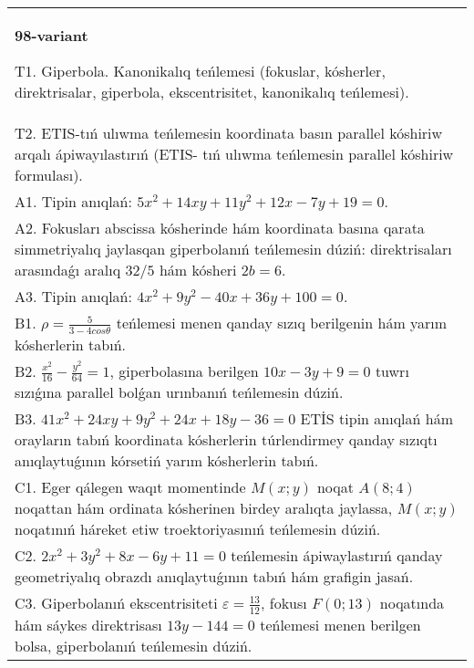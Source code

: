 \documentclass{article}
\begin{document}
\begin{tabular}{m{17cm}}
\textbf{98-variant}
\newline

T1. Giperbola. Kanonikalıq teńlemesi (fokuslar, kósherler, direktrisalar, giperbola, ekscentrisitet, kanonikalıq teńlemesi).\\

T2. ETIS-tıń ulıwma teńlemesin koordinata basın parallel kóshiriw arqalı ápiwayılastırıń (ETIS- tıń ulıwma teńlemesin parallel kóshiriw formulası).\\

A1. Tipin anıqlań: $5 x^{2}+14 xy+11 y^{2}+12 x-7 y+19=0$.\\

A2. Fokusları abscissa kósherinde hám koordinata basına qarata simmetriyalıq jaylasqan giperbolanıń teńlemesin dúziń: direktrisaları arasındaǵı aralıq $32/5$ hám kósheri $2 b=6$.\\

A3. Tipin anıqlań: $4 x^2+9 y^2-40 x+36 y+100=0$.\\

B1. $\rho = \frac{5}{3 - 4cos\theta}$ teńlemesi menen qanday sızıq berilgenin hám yarım kósherlerin tabıń.  \\

B2. $\frac{x^{2}}{16} - \frac{y^{2}}{64} = 1$, giperbolasına berilgen $10x - 3y + 9 = 0$ tuwrı sızıǵına parallel bolǵan urınbanıń teńlemesin dúziń.  \\

B3. $41x^{2} + 24xy + 9y^{2} + 24x + 18y - 36 = 0$ ETİS tipin anıqlań hám orayların tabıń koordinata kósherlerin túrlendirmey qanday sızıqtı anıqlaytuǵının kórsetiń yarım kósherlerin tabıń.  \\

C1. Eger qálegen waqıt momentinde $M(x;y)$ noqat $A(8;4)$ noqattan hám ordinata kósherinen birdey aralıqta jaylassa, $M(x;y)$ noqatınıń háreket etiw troektoriyasınıń teńlemesin dúziń.  \\

C2. $2x^{2} + 3y^{2} + 8x - 6y + 11 = 0$ teńlemesin ápiwaylastırıń qanday geometriyalıq obrazdı anıqlaytuǵının tabıń hám grafigin jasań.\\

C3. Giperbolanıń ekscentrisiteti $\varepsilon = \frac{13}{12}$, fokusı $F(0;13)$ noqatında hám sáykes direktrisası $13y - 144 = 0$ teńlemesi menen berilgen bolsa, giperbolanıń teńlemesin dúziń.  \\

\end{tabular}
\vspace{1cm}
\end{document}
